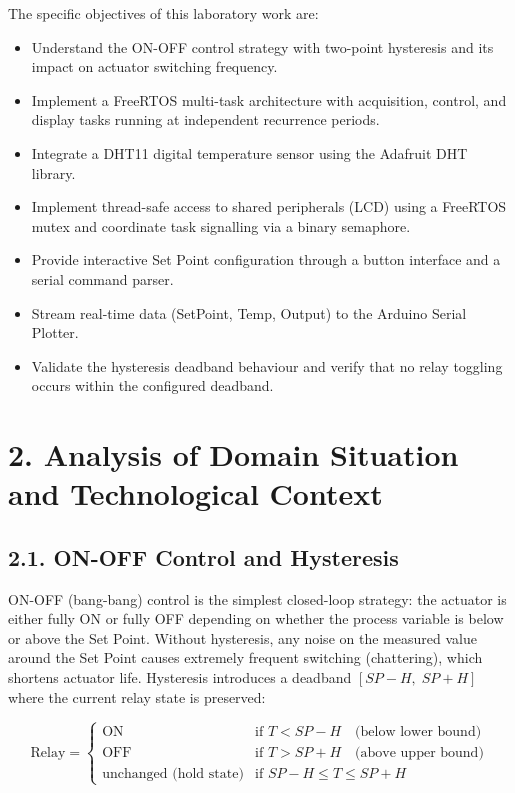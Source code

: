 \documentclass[12pt]{article}
\begin{document}
The specific objectives of this laboratory work are:
\begin{itemize}
    \item Understand the ON-OFF control strategy with two-point hysteresis and its
          impact on actuator switching frequency.
    \item Implement a FreeRTOS multi-task architecture with acquisition, control, and
          display tasks running at independent recurrence periods.
    \item Integrate a DHT11 digital temperature sensor using the Adafruit DHT library.
    \item Implement thread-safe access to shared peripherals (LCD) using a FreeRTOS
          mutex and coordinate task signalling via a binary semaphore.
    \item Provide interactive Set Point configuration through a button interface and a
          serial command parser.
    \item Stream real-time data (SetPoint, Temp, Output) to the Arduino Serial Plotter.
    \item Validate the hysteresis deadband behaviour and verify that no relay toggling
          occurs within the configured deadband.
\end{itemize}

\section*{2. Analysis of Domain Situation and Technological Context}

\subsection*{2.1. ON-OFF Control and Hysteresis}

ON-OFF (bang-bang) control is the simplest closed-loop strategy: the actuator is
either fully ON or fully OFF depending on whether the process variable is below or
above the Set Point. Without hysteresis, any noise on the measured value around the
Set Point causes extremely frequent switching (chattering), which shortens actuator
life. Hysteresis introduces a deadband $[SP - H,\; SP + H]$ where the current relay
state is preserved:

\begin{equation}
    \text{Relay} =
    \begin{cases}
        \text{ON}                     & \text{if } T < SP - H \quad\text{(below lower bound)}\\
        \text{OFF}                    & \text{if } T > SP + H \quad\text{(above upper bound)}\\
        \text{unchanged (hold state)} & \text{if } SP - H \le T \le SP + H
    \end{cases}
\end{equation}
\end{document}
